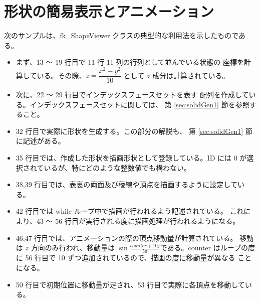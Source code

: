 \section{形状の簡易表示とアニメーション} \label{sec:sampleviewer}
次のサンプルは、fk\_ShapeViewer クラスの典型的な利用法を示したものである。
\begin{itemize}
 \item まず、13 〜 19 行目で 11 行 11 列の行列として並んでいる状態の
	座標を計算している。その際、\(z = \dfrac{x^2 - y^2}{10}\)
	として \(z\) 成分は計算されている。

 \item 次に、22 〜 29 行目でインデックスフェースセットを表す
	配列を作成している。インデックスフェースセットに関しては、
	第 \ref{sec:solidGen1} 節を参照すること。

 \item 32 行目で実際に形状を生成する。この部分の解説も、
	第 \ref{sec:solidGen1} 節に記述がある。

 \item 35 行目では、作成した形状を描画形状として登録している。ID には
	0 が選択されているが、特にどのような整数値でも構わない。

 \item 38,39 行目では、表裏の両面及び稜線や頂点を描画するように設定している。

 \item 42 行目では while ループ中で描画が行われるよう記述されている。
	これにより、43 〜 56 行目が実行される度に描画処理が行われるようになる。

 \item 46,47 行目では、アニメーションの際の頂点移動量が計算されている。
	移動は \(z\) 方向のみ行われ、移動量は
	\(\sin\frac{counter + 10j}{5\pi}\)である。counter はループの度に
	56 行目で 10 ずつ追加されているので、描画の度に移動量が異なる
	ことになる。

 \item 50 行目で初期位置に移動量が足され、53 行目で実際に各頂点を移動している。
\end{itemize}

